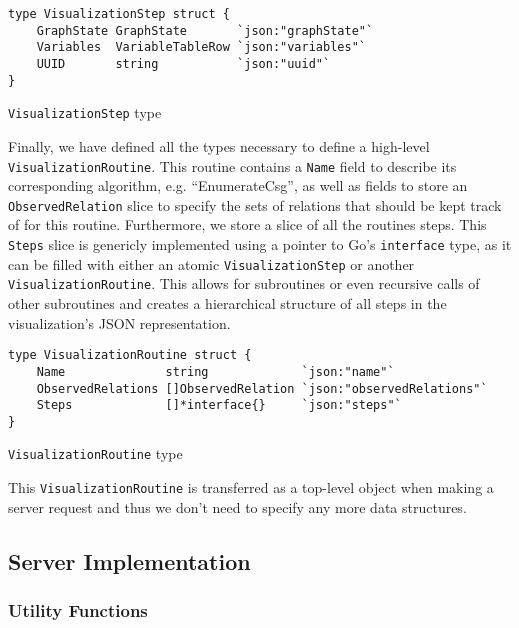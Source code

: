 \begin{code}
\begin{verbatim}
type VisualizationStep struct {
    GraphState GraphState       `json:"graphState"`
    Variables  VariableTableRow `json:"variables"`
    UUID       string           `json:"uuid"`
}
\end{verbatim}
\caption{\texttt{VisualizationStep} type}
\end{code}
\vspace{0.8cm}

Finally, we have defined all the types necessary to define a high-level \texttt{VisualizationRoutine}. This routine contains a \texttt{Name} field to describe its corresponding algorithm, e.g. ``EnumerateCsg'', as well as fields to store an \texttt{ObservedRelation} slice to specify the sets of relations that should be kept track of for this routine. Furthermore, we store a slice of all the routines steps. This \texttt{Steps} slice is genericly implemented using a pointer to Go's \texttt{interface{}} type, as it can be filled with either an atomic \texttt{VisualizationStep} or another \texttt{VisualizationRoutine}. This allows for subroutines or even recursive calls of other subroutines and creates a hierarchical structure of all steps in the visualization's JSON representation. 

\begin{code}
\begin{verbatim}
type VisualizationRoutine struct {
    Name              string             `json:"name"`
    ObservedRelations []ObservedRelation `json:"observedRelations"`
    Steps             []*interface{}     `json:"steps"`
}
\end{verbatim}
\caption{\texttt{VisualizationRoutine} type}
\end{code}
\label{datastructure:visualization-routine}
\vspace{0.8cm}

This \texttt{VisualizationRoutine} is transferred as a top-level object when making a server request and thus we don't need to specify any more data structures.

\subsection{Server Implementation}

\subsubsection{Utility Functions}

